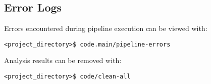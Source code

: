 \subsection{Error Logs}
Errors encountered during pipeline execution can be viewed with:

\begin{lstlisting}
<project_directory>$ code.main/pipeline-errors
\end{lstlisting}

Analysis results can be removed with:

\begin{lstlisting}
<project_directory>$ code/clean-all
\end{lstlisting}
